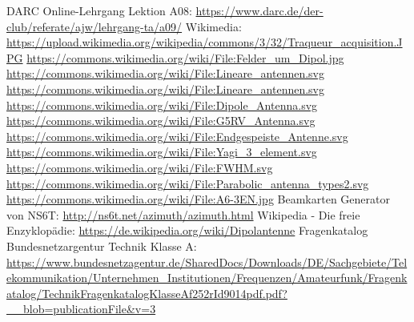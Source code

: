 \begin{thebibliography}{}
      DARC Online-Lehrgang Lektion A08:
                    \url{https://www.darc.de/der-club/referate/ajw/lehrgang-ta/a09/}
     	Wikimedia:
                    \url{https://upload.wikimedia.org/wikipedia/commons/3/32/Traqueur_acquisition.JPG}
                    \url{https://commons.wikimedia.org/wiki/File:Felder_um_Dipol.jpg}
                    \url{https://commons.wikimedia.org/wiki/File:Lineare_antennen.svg}
                    \url{https://commons.wikimedia.org/wiki/File:Lineare_antennen.svg}
                    \url{https://commons.wikimedia.org/wiki/File:Dipole_Antenna.svg}
                    \url{https://commons.wikimedia.org/wiki/File:G5RV_Antenna.svg}
                    \url{https://commons.wikimedia.org/wiki/File:Endgespeiste_Antenne.svg}
                    \url{https://commons.wikimedia.org/wiki/File:Yagi_3_element.svg}
                    \url{https://commons.wikimedia.org/wiki/File:FWHM.svg}
                    \url{https://commons.wikimedia.org/wiki/File:Parabolic_antenna_types2.svg}
                    \url{https://commons.wikimedia.org/wiki/File:A6-3EN.jpg}
                    \url{}
      Beamkarten Generator von NS6T:
                    \url{http://ns6t.net/azimuth/azimuth.html}
        Wikipedia - Die freie Enzyklopädie:
                    \url{https://de.wikipedia.org/wiki/Dipolantenne}
	   Fragenkatalog Bundesnetzargentur Technik Klasse A:                   
                    \url{https://www.bundesnetzagentur.de/SharedDocs/Downloads/DE/Sachgebiete/Telekommunikation/Unternehmen_Institutionen/Frequenzen/Amateurfunk/Fragenkatalog/TechnikFragenkatalogKlasseAf252rId9014pdf.pdf?__blob=publicationFile&v=3}
\end{thebibliography} 


